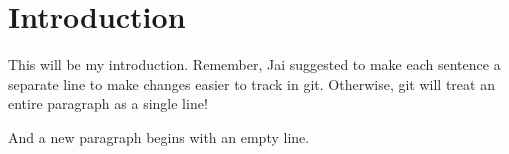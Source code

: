 \documentclass[../AnalysisNoteJBuxton.tex]{subfiles}
\begin{document}
\section{Introduction}

This will be my introduction.
Remember, Jai suggested to make each sentence a separate line to make changes easier to track in git.
Otherwise, git will treat an entire paragraph as a single line!

And a new paragraph begins with an empty line.
\end{document}
